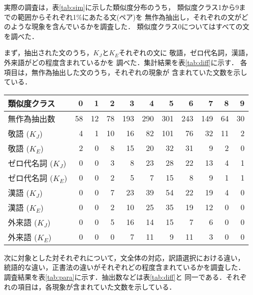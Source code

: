 実際の調査は，表\ref{tab:sim}に示した類似度分布のうち，
類似度クラス1から9までの範囲からそれぞれ1\%にあたる文(ペア)を
無作為抽出し，それぞれの文がどのような現象を含んでいるかを調査した．
類似度クラス0についてはすべての文を調べた．

まず，抽出された文のうち，$K_J$と$K_E$それぞれの文に
敬語，ゼロ代名詞，漢語，外来語がどの程度含まれているかを
調べた．集計結果を表\ref{tab:diff}に示す．
各項目は，無作為抽出した文のうち，それぞれの現象が
含まれていた文数を示している．

\begin{table*}[tb]
\caption{$K_J$ と $K_E$における言語現象とその頻度}
\label{tab:diff}
\begin{center}
\begin{tabular}{l|rrrrrrrrrr}
\hline\hline
類似度クラス & 0 & 1 & 2 & 3 &4 &5 &6 &7&8 &9\\
\hline
無作為抽出数 & 58 & 12 & 78 & 193 & 290 & 301 & 243 & 149 & 64 & 30\\
 \hline
敬語 ($K_J$) & 4 & 1 & 10 & 16 & 82 & 101 & 76 & 32 & 11 & 2\\
敬語 ($K_E$) & 2 & 0 & 8  & 15 & 20 & 32  & 31 & 9  & 2  & 0\\
\hline
ゼロ代名詞 ($K_J$) & 0 & 0 & 3 & 8 & 23 & 28 & 22 & 13 & 4 & 1\\
ゼロ代名詞 ($K_E$) & 0 &0 & 2 & 5 & 7  & 15 & 8  & 9  & 1 & 1\\
\hline
漢語 ($K_J$) & 0 & 0 & 7 & 23 & 39 & 54 & 22 & 19 & 4 & 0 \\
漢語 ($K_E$) & 0 & 0 & 2 & 10 & 25 & 35 & 19 & 12 & 0 & 0\\
\hline
外来語 ($K_J$) & 0 & 0 & 5 & 16 & 14 & 15 & 7  & 6 & 0 & 0\\
外来語 ($K_E$) & 0 & 0 & 0 &  7 & 11 &  9 & 11 & 3 & 0 & 0\\
 \hline \hline
 \end{tabular}
\end{center}
\end{table*}


次に対象とした対それぞれについて，文全体の対応，訳語選択における違い，
統語的な違い，正書法の違いがそれぞれどの程度含まれているかを調査した．
調査結果を表\ref{tab:para}に示す．抽出数などは表\ref{tab:diff}と
同一である．それぞれの項目は，各現象が含まれていた文数を示している．

